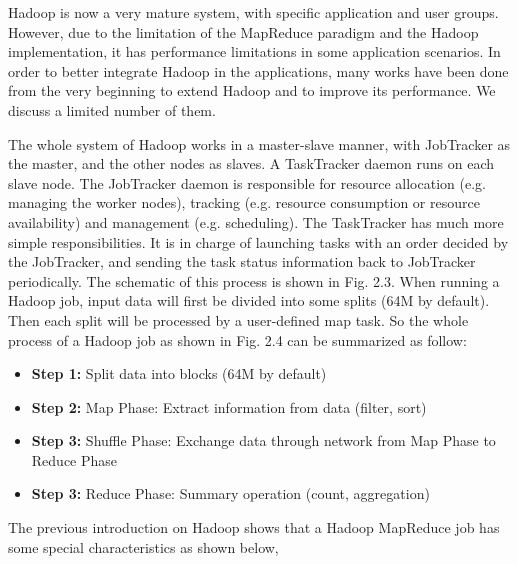 \documentclass[	DIV=calc,%
							paper=a4,%
							fontsize=11pt,%
							twocolumn]{scrartcl}	 					%
\begin{document}
Hadoop is now a very mature system, with specific application and user groups. However, due to the limitation of the MapReduce paradigm and the Hadoop implementation, it has performance limitations in some application scenarios. In order to better integrate Hadoop in the applications, 
many works have been done from the very beginning to extend Hadoop and to improve its performance. We discuss a limited number of them.

The whole system of Hadoop works in a master-slave manner, with JobTracker as the master, and the other nodes as slaves. A TaskTracker daemon runs on each slave node. The JobTracker daemon is responsible for resource allocation (e.g. managing the worker nodes), tracking (e.g. resource consumption or resource availability) and management (e.g. scheduling). The TaskTracker has much more simple responsibilities. It is in charge of launching tasks with an order decided by the JobTracker, and sending the task status information back to JobTracker periodically. The schematic of this process is shown in Fig. 2.3.
When running a Hadoop job, input data will first be divided into some splits (64M by default). Then each split will be processed by a user-defined map task.
So the whole process of a Hadoop job as shown in Fig. 2.4 can be summarized as follow:

\begin{itemize}

\item \textbf{Step 1:} Split data into blocks (64M by default)

\item \textbf{Step 2:} Map Phase: Extract information from data (filter, sort)

\item \textbf{Step 3:} Shuffle Phase: Exchange data through network from Map Phase to Reduce Phase

\item \textbf{Step 3:} Reduce Phase: Summary operation (count, aggregation)

\end{itemize}

The previous introduction on Hadoop shows that a Hadoop MapReduce job has some
special characteristics as shown below,
\end{document}
